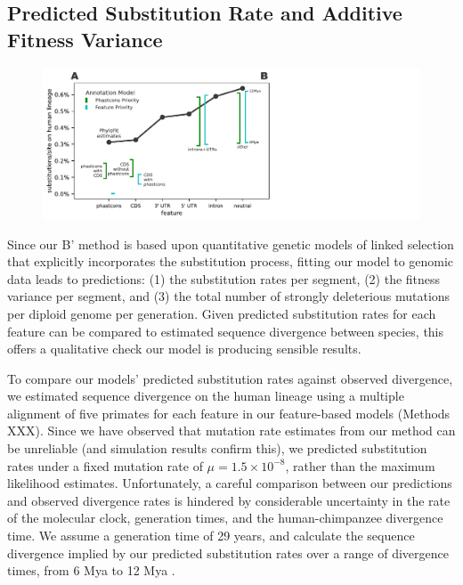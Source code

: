\documentclass[11pt]{article}
\begin{document}
\subsection*{Predicted Substitution Rate and Additive Fitness Variance}

\begin{figure}[htbp] \centering
    \includegraphics[width=\textwidth]{figures/figure_6.pdf} 

    \caption{}

  \label{fig:figure-6}
\end{figure}

Since our B' method is based upon quantitative genetic models of linked
selection that explicitly incorporates the substitution process, fitting our
model to genomic data leads to predictions: (1) the substitution rates per
segment, (2) the fitness variance per segment, and (3) the total number of
strongly deleterious mutations per diploid genome per generation. Given
predicted substitution rates for each feature can be compared to estimated
sequence divergence between species, this offers a qualitative check our model
is producing sensible results. 

To compare our models' predicted substitution rates against observed
divergence, we estimated sequence divergence on the human lineage using a
multiple alignment of five primates for each feature in our feature-based
models (Methods XXX). Since we have observed that mutation rate estimates from
our method can be unreliable (and simulation results confirm this), we
predicted substitution rates under a fixed mutation rate of $\mu = 1.5 \times
10^{-8}$, rather than the maximum likelihood estimates. Unfortunately, a
careful comparison between our predictions and observed divergence rates is
hindered by considerable uncertainty in the rate of the molecular clock,
generation times, and the human-chimpanzee divergence time. We assume a
generation time of 29 years, and calculate the sequence divergence implied by
our predicted substitution rates over a range of divergence times, from 6 Mya
to 12 Mya \parencite{Moorjani2016-tb,Nachman2000-te,Yi2002-pw,Steiper2006-xx}.
\end{document}
